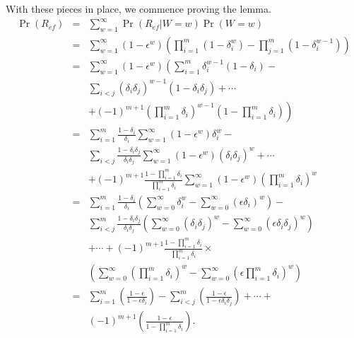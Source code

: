 \documentclass[10pt,twocolumn,twoside]{IEEEtran} \newlength{\pic}
\theoremstyle{definition}
\theoremstyle{remark}
\theoremstyle{plain}
\begin{document}
\begin{IEEEproof}
With these pieces in place, we commence proving the lemma.
\begin{eqnarray}\label{eq:longListEqns}
 \Pr(R_{ef}) &=& \sum_{w=1}^\infty\Pr(R_{ef}|W=w)\Pr(W=w) \nonumber \\
 &=& \sum_{w=1}^\infty(1-\epsilon^w)\left(\prod_{i=1}^m(1-\delta_i^w) - \prod_{j=1}^m(1-\delta_i^{w-1})\right) \nonumber \\
 &=& \sum_{w=1}^\infty(1-\epsilon^w)\left(\sum_{i=1}^m\delta_i^{w-1}(1-\delta_i) - \right. \nonumber \\ & & \sum_{i<j}(\delta_i\delta_j)^{w-1}(1-\delta_i\delta_j) + \cdots \nonumber \\ & & + \left. (-1)^{m+1}(\prod_{i=1}^m\delta_i)^{w-1}(1-\prod_{i=1}^m\delta_i)\right) \nonumber \\
 &=& \sum_{i=1}^m\frac{1-\delta_i}{\delta_i}\sum_{w=1}^\infty(1-\epsilon^w)\delta_i^w - \nonumber \\ & & \sum_{i<j}\frac{1-\delta_i\delta_j}{\delta_i\delta_j}\sum_{w=1}^\infty(1-\epsilon^w)(\delta_i\delta_j)^w + \cdots \nonumber \\ & & + (-1)^{m+1}\frac{1-\prod_{i=1}^m\delta_i}{\prod_{i=1}^m\delta_i}\sum_{w=1}^\infty(1-\epsilon^w)(\prod_{i=1}^m\delta_i)^w \nonumber \\
 &=& \sum_{i=1}^m\frac{1-\delta_i}{\delta_i}\left(\sum_{w=0}^\infty\delta_i^w - \sum_{w=0}^\infty(\epsilon\delta_i)^w\right) - \nonumber \\ & & \sum_{i<j}^m\frac{1-\delta_i\delta_j}{\delta_i\delta_j}\left(\sum_{w=0}^\infty(\delta_i\delta_j)^w - \sum_{w=0}^\infty(\epsilon\delta_i\delta_j)^w\right)  \nonumber \\ & & + \cdots + (-1)^{m+1}\frac{1-\prod_{i=1}^m\delta_i}{\prod_{i=1}^m\delta_i}\times \nonumber \\ & & \left(\sum_{w=0}^\infty(\prod_{i=1}^m\delta_i)^w - \sum_{w=0}^\infty(\epsilon\prod_{i=1}^m\delta_i)^w\right) \nonumber\\
 &=& \sum_{i=1}^m\left(\frac{1-\epsilon}{1-\epsilon\delta_i}\right) - \sum_{i<j}^m\left(\frac{1-\epsilon}{1-\epsilon\delta_i\delta_j}\right) + \cdots + \nonumber \\ & & (-1)^{m+1}\left(\frac{1-\epsilon}{1-\prod_{i=1}^m\delta_i}\right).
\end{eqnarray}
\end{IEEEproof}
\end{document}
